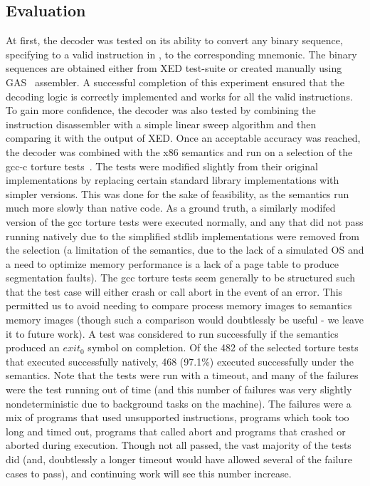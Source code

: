 \subsection{Evaluation}
At first, the decoder was tested on its ability to  convert any binary sequence, specifying to a valid instruction in \ISA, to the corresponding mnemonic. The binary sequences are  obtained either from XED test-suite or created manually using GAS~\cite{gas} assembler. A successful completion of this experiment ensured that the decoding logic is correctly implemented and works for all the valid \ISA instructions. To gain more confidence, the decoder was also tested by combining the instruction disassembler with a simple linear sweep algorithm and then comparing it with the output of XED.  Once an acceptable accuracy was reached, the decoder was combined with the x86 semantics and run on a selection of the gcc-c torture tests~\cite{CTORTURE}.  The tests were modified slightly from their original implementations by replacing certain standard library implementations with simpler versions.  This was done for the sake of feasibility, as the semantics run much more slowly than native code.  As a ground truth, a similarly modifed version of the gcc torture tests were executed normally, and any that did not pass running natively due to the simplified stdlib implementations were removed from the selection (a limitation of the semantics, due to the lack of a simulated OS and a need to optimize memory performance is a lack of a page table to produce segmentation faults).  The gcc torture tests seem generally to be structured such that the test case will either crash or call abort in the event of an error.  This permitted us to avoid needing to compare process memory images to semantics memory images (though such a comparison would doubtlessly be useful - we leave it to future work).  A test was considered to run successfully if the semantics produced an $exit_0$ symbol on completion.  Of the 482 of the selected torture tests that executed successfully natively, 468 (97.1\%) executed successfully under the semantics.  Note that the tests were run with a timeout, and many of the failures were the test running out of time (and this number of failures was very slightly nondeterministic due to background tasks on the machine).  The failures were a mix of programs that used unsupported instructions, programs which took too long and timed out, programs that called abort and programs that crashed or aborted during execution.  Though not all passed, the vast majority of the tests did (and, doubtlessly a longer timeout would have allowed several of the failure cases to pass), and continuing work will see this number increase.


